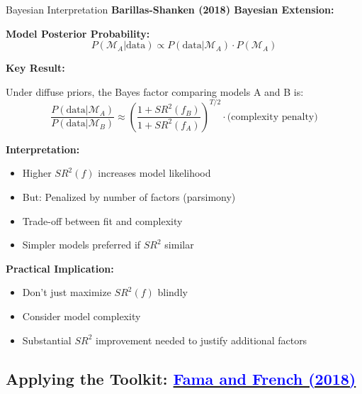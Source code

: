 \documentclass{beamer}
\begin{document}
\begin{frame}[allowframebreaks]{Bayesian Interpretation}
    \textbf{Barillas-Shanken (2018) Bayesian Extension:}

    \textbf{Model Posterior Probability:}
    \begin{equation}\label{eq:bayesian}
        P(\mathcal{M}_A | \text{data}) \propto P(\text{data} | \mathcal{M}_A) \cdot P(\mathcal{M}_A)
    \end{equation}
    
    \textbf{Key Result:}
    
    Under diffuse priors, the Bayes factor comparing models A and B is:
    \begin{equation*}
        \frac{P(\text{data} | \mathcal{M}_A)}{P(\text{data} | \mathcal{M}_B)} \approx \left(\frac{1 + SR^2(f_B)}{1 + SR^2(f_A)}\right)^{T/2} \cdot \text{(complexity penalty)}
    \end{equation*}
    
    \vspace{0.3cm}
    \textbf{Interpretation:}
    \begin{itemize}
        \item Higher $SR^2(f)$ increases model likelihood
        \item But: Penalized by number of factors (parsimony)
        \item Trade-off between fit and complexity
        \item Simpler models preferred if $SR^2$ similar
    \end{itemize}
    
    \textbf{Practical Implication:}
    \begin{itemize}
        \item Don't just maximize $SR^2(f)$ blindly
        \item Consider model complexity
        \item Substantial $SR^2$ improvement needed to justify additional factors
    \end{itemize}
\end{frame}

\subsection{Applying the Toolkit: \href{https://doi.org/10.1016/j.jfineco.2018.02.012}{\textcolor{blue}{Fama and French (2018)}}}
\end{document}
